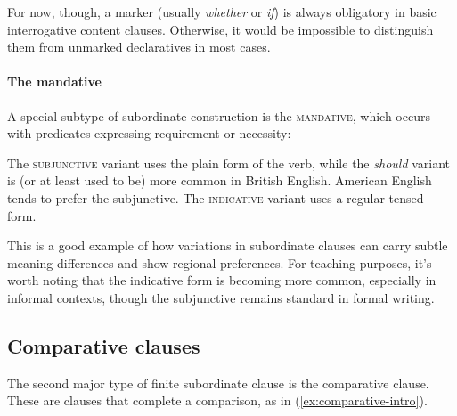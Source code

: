 \label{ex:non-inverted-interrogative}
\z

For now, though, a marker (usually \textit{whether} or \textit{if}) is always obligatory in basic interrogative content clauses. Otherwise, it would be impossible to distinguish them from unmarked declaratives in most cases.

\paragraph*{The mandative}

A special subtype of subordinate construction is the \textsc{mandative}, which occurs with predicates expressing requirement or necessity:

\ea \label{ex:mandative}
    \z
\z

The \textsc{subjunctive} variant uses the plain form of the verb, while the \textit{should} variant is (or at least used to be) more common in British English. American English tends to prefer the subjunctive. The \textsc{indicative} variant uses a regular tensed form.

This is a good example of how variations in subordinate clauses can carry subtle meaning differences and show regional preferences. For teaching purposes, it's worth noting that the indicative form is becoming more common, especially in informal contexts, though the subjunctive remains standard in formal writing.

\subsection{Comparative clauses}

The second major type of finite subordinate clause is the comparative clause. These are clauses that complete a comparison, as in (\ref{ex:comparative-intro}).

\ea \label{ex:comparative-intro}
    \z
\z

